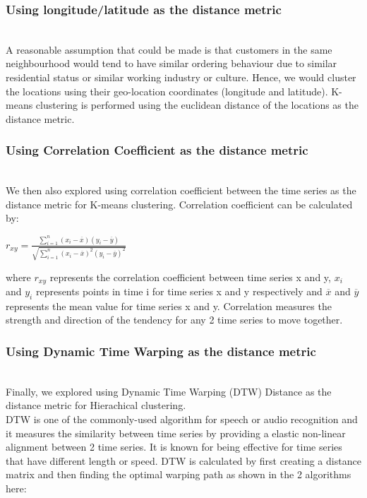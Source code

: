 \documentclass[nonblindrev,msom]{informs3} %
\begin{document}
\subsubsection{Using longitude/latitude as the distance metric}
\hfill\\
A reasonable assumption that could be made is that customers in the same neighbourhood would tend to have similar ordering behaviour due to similar residential status or similar working industry or culture. Hence, we would cluster the locations using their geo-location coordinates (longitude and latitude). K-means clustering is performed using the euclidean distance of the locations as the distance metric.   

\subsubsection{Using Correlation Coefficient as the distance metric}
\hfill\\
We then also explored using correlation coefficient between the time series as the distance metric for K-means clustering. Correlation coefficient can be calculated by: 

\begin{center}
$r_{xy} = \frac{\sum_{i=1}^{n} (x_i - \overline{x})(y_i - \overline{y})}
{\sqrt{\sum_{i=1}^{n} (x_i - \overline{x})^2(y_i - \overline{y})^2}} $
\end{center}

\noindent where $r_{xy}$ represents the correlation coefficient between time series x and y, $x_i$ and $y_i$ represents points in time i for time series x and y respectively and $\overline{x}$ and $\overline{y}$ represents the mean value for time series x and y. Correlation measures the strength and direction of the tendency for any 2 time series to move together. 

\subsubsection{Using Dynamic Time Warping as the distance metric}
\hfill\\
Finally, we explored using Dynamic Time Warping (DTW) Distance as the distance metric for Hierachical clustering. \\

\noindent DTW is one of the commonly-used algorithm for speech or audio recognition and it measures the similarity between time series by providing a elastic non-linear alignment between 2 time series. It is known for being effective for time series that have different length or speed. DTW is calculated by first creating a distance matrix and then finding the optimal warping path as shown in the 2 algorithms here:
\end{document}
